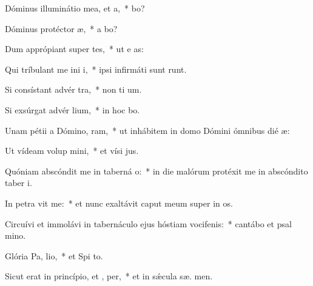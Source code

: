 \item Dóminus illuminátio mea, et  a,~*  bo?
\item Dóminus protéctor  æ,~* a  bo?
\item Dum apprópiant super  tes,~* ut e  as:
\item Qui tríbulant me ini i,~* ipsi infirmáti sunt  runt.
\item Si consístant advér  tra,~* non ti  um.
\item Si exsúrgat advér  lium,~* in hoc  bo.
\item Unam pétii a Dómino,  ram,~* ut inhábitem in domo Dómini ómnibus dié  æ:
\item Ut vídeam volup mini,~* et vísi  jus.
\item Quóniam abscóndit me in taberná o:~* in die malórum protéxit me in abscóndito taber i.
\item In petra vit me:~* et nunc exaltávit caput meum super in os.
\item Circuívi et immolávi in tabernáculo ejus hóstiam vocifenis:~* cantábo et psal  mino.
\item Glória Pa,  lio,~* et Spi to.
\item Sicut erat in princípio, et ,  per,~* et in sǽcula sæ. men.
